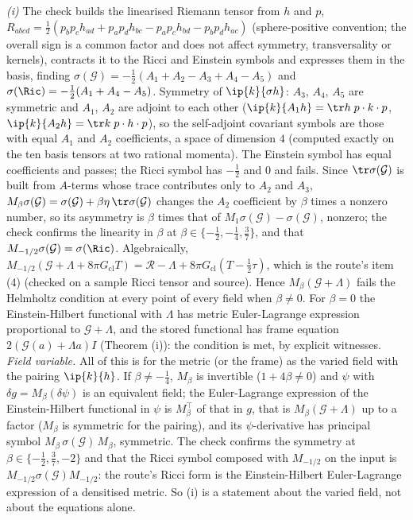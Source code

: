 \emph{(i)} The check builds the linearised Riemann tensor from $h$ and $p$, $R_{abcd} = \tfrac12(p_{b}p_{c}h_{ad} + p_{a}p_{d}h_{bc} - p_{a}p_{c}h_{bd} - p_{b}p_{d}h_{ac})$ (sphere-positive convention; the overall sign is a common factor and does not affect symmetry, transversality or kernels), contracts it to the Ricci and Einstein symbols and expresses them in the basis, finding $\sigma(\mathcal{G}) = -\tfrac12(A_{1} + A_{2} - A_{3} + A_{4} - A_{5})$ and $\sigma(\Ric) = -\tfrac12(A_{1} + A_{4} - A_{5})$. Symmetry of $\ip{k}{\sigma h}$: $A_{3}$, $A_{4}$, $A_{5}$ are symmetric and $A_{1}$, $A_{2}$ are adjoint to each other ($\ip{k}{A_{1}h} = \tr h\;p\cdot k\cdot p$, $\ip{k}{A_{2}h} = \tr k\;p\cdot h\cdot p$), so the self-adjoint covariant symbols are those with equal $A_{1}$ and $A_{2}$ coefficients, a space of dimension $4$ (computed exactly on the ten basis tensors at two rational momenta). The Einstein symbol has equal coefficients and passes; the Ricci symbol has $-\tfrac12$ and $0$ and fails. Since $\tr\sigma(\mathcal{G})$ is built from $A$-terms whose trace contributes only to $A_{2}$ and $A_{3}$, $M_{\beta}\sigma(\mathcal{G}) = \sigma(\mathcal{G}) + \beta\eta\,\tr\sigma(\mathcal{G})$ changes the $A_{2}$ coefficient by $\beta$ times a nonzero number, so its asymmetry is $\beta$ times that of $M_{1}\sigma(\mathcal{G}) - \sigma(\mathcal{G})$, nonzero; the check confirms the linearity in $\beta$ at $\beta \in \{-\tfrac12, -\tfrac14, \tfrac37\}$, and that $M_{-1/2}\sigma(\mathcal{G}) = \sigma(\Ric)$. Algebraically, $M_{-1/2}(\mathcal{G} + \Lambda + 8\pi G_{\mathrm{cl}}T) = \mathcal{R} - \Lambda + 8\pi G_{\mathrm{cl}}(T - \tfrac12\tau)$, which is the route's item (4) (checked on a sample Ricci tensor and source). Hence $M_{\beta}(\mathcal{G} + \Lambda)$ fails the Helmholtz condition at every point of every field when $\beta \neq 0$. For $\beta = 0$ the Einstein-Hilbert functional with $\Lambda$ has metric Euler-Lagrange expression proportional to $\mathcal{G} + \Lambda$, and the stored functional has frame equation $2(\mathcal{G}(a) + \Lambda a)I$ (Theorem (i)): the condition is met, by explicit witnesses. \emph{Field variable.} All of this is for the metric (or the frame) as the varied field with the pairing $\ip{k}{h}$. If $\beta \neq -\tfrac14$, $M_{\beta}$ is invertible ($1 + 4\beta \neq 0$) and $\psi$ with $\delta g = M_{\beta}(\delta\psi)$ is an equivalent field; the Euler-Lagrange expression of the Einstein-Hilbert functional in $\psi$ is $M_{\beta}^{\top}$ of that in $g$, that is $M_{\beta}(\mathcal{G} + \Lambda)$ up to a factor ($M_{\beta}$ is symmetric for the pairing), and its $\psi$-derivative has principal symbol $M_{\beta}\,\sigma(\mathcal{G})\,M_{\beta}$, symmetric. The check confirms the symmetry at $\beta \in \{-\tfrac12, \tfrac37, -2\}$ and that the Ricci symbol composed with $M_{-1/2}$ on the input is $M_{-1/2}\sigma(\mathcal{G})M_{-1/2}$: the route's Ricci form is the Einstein-Hilbert Euler-Lagrange expression of a densitised metric. So (i) is a statement about the varied field, not about the equations alone.

